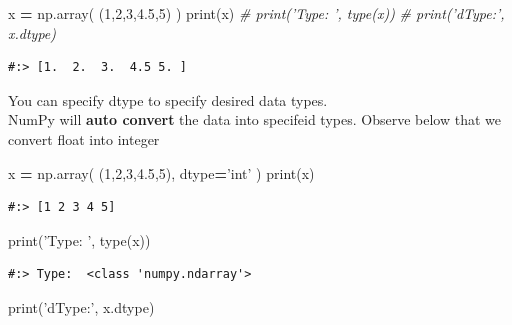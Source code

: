 \documentclass[
]{book}
\newenvironment{Shaded}{\begin{snugshade}}{\end{snugshade}}
\newcommand{\BuiltInTok}[1]{#1}
\newcommand{\CommentTok}[1]{\textcolor[rgb]{0.37,0.37,0.37}{\textit{#1}}}
\newcommand{\DecValTok}[1]{\textcolor[rgb]{0.06,0.06,0.06}{#1}}
\newcommand{\FloatTok}[1]{\textcolor[rgb]{0.06,0.06,0.06}{#1}}
\newcommand{\NormalTok}[1]{#1}
\newcommand{\OperatorTok}[1]{\textcolor[rgb]{0.43,0.43,0.43}{\textbf{#1}}}
\newcommand{\StringTok}[1]{\textcolor[rgb]{0.5,0.5,0.5}{#1}}
\begin{document}
\begin{Shaded}
\begin{Highlighting}[]
\NormalTok{x }\OperatorTok{=}\NormalTok{ np.array( (}\DecValTok{1}\NormalTok{,}\DecValTok{2}\NormalTok{,}\DecValTok{3}\NormalTok{,}\FloatTok{4.5}\NormalTok{,}\DecValTok{5}\NormalTok{) )}
\BuiltInTok{print}\NormalTok{(x)}
\CommentTok{# print('Type: ', type(x))}
\CommentTok{# print('dType:', x.dtype)}
\end{Highlighting}
\end{Shaded}

\begin{verbatim}
#:> [1.  2.  3.  4.5 5. ]
\end{verbatim}

You can specify dtype to specify desired data types.\\
NumPy will \textbf{auto convert} the data into specifeid types. Observe below that we convert float into integer

\begin{Shaded}
\begin{Highlighting}[]
\NormalTok{x }\OperatorTok{=}\NormalTok{ np.array( (}\DecValTok{1}\NormalTok{,}\DecValTok{2}\NormalTok{,}\DecValTok{3}\NormalTok{,}\FloatTok{4.5}\NormalTok{,}\DecValTok{5}\NormalTok{), dtype}\OperatorTok{=}\StringTok{'int'}\NormalTok{ )}
\BuiltInTok{print}\NormalTok{(x)}
\end{Highlighting}
\end{Shaded}

\begin{verbatim}
#:> [1 2 3 4 5]
\end{verbatim}

\begin{Shaded}
\begin{Highlighting}[]
\BuiltInTok{print}\NormalTok{(}\StringTok{'Type: '}\NormalTok{, }\BuiltInTok{type}\NormalTok{(x))}
\end{Highlighting}
\end{Shaded}

\begin{verbatim}
#:> Type:  <class 'numpy.ndarray'>
\end{verbatim}

\begin{Shaded}
\begin{Highlighting}[]
\BuiltInTok{print}\NormalTok{(}\StringTok{'dType:'}\NormalTok{, x.dtype)}
\end{Highlighting}
\end{Shaded}
\end{document}
